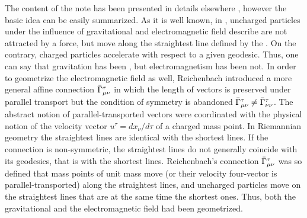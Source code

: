 \documentclass[draft]{article}
\newcommand{\ap}{\ensuremath{\tau}\xspace}
\newcommand{\dap}{\ensuremath{d\ap}\xspace}
\newcommand{\Gtmnbar}{\ensuremath{\bar{\Gamma}\tmn}\xspace}
\begin{document}
The content of the note has been presented in details elsewhere \citep{Giovanelli2016}, however the basic idea can be easily summarized. As it is well known, in \gr, uncharged particles under the influence of gravitational and electromagnetic field describe are not attracted by a force, but move along the straightest line defined by the \Gtmn. On the contrary, charged particles accelerate with respect to a given geodesic. Thus, one can say that gravitation has been , but electromagnetism has been not. In order to geometrize the electromagnetic field as well, Reichenbach introduced a more general affine connection \Gtmnbar in which the length of vectors is preserved under parallel transport but the condition of symmetry is abandoned $\Gtmnbar \neq \bar{\Gamma}^\tau_{\nu\nu}$. The abstract notion of parallel-transported vectors were coordinated with the physical notion of the velocity vector $u^\tau=dx_\nu/\dap$ of a charged mass point. In Riemannian geometry the straightest lines are identical with the shortest lines. If the connection is non-symmetric, the straightest lines do not generally coincide with its geodesics, that is with the shortest lines. Reichenbach's connection \Gtmnbar was so defined that mass points of unit mass move (or their velocity four-vector is parallel-transported) along the straightest lines, and uncharged particles move on the straightest lines that are at the same time the shortest ones. Thus, both the gravitational and the electromagnetic field had been geometrized.


\end{document}
